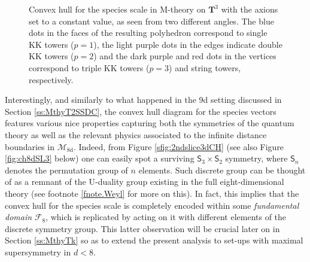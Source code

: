 \begin{figure}[htb]
		\begin{center}
			\caption{\small Convex hull for the species scale in M-theory on $\mathbf{T}^3$ with the axions set to a constant value, as seen from two different angles. The blue dots in the faces of the resulting polyhedron correspond to single KK towers ($p=1$), the light purple dots in the edges indicate double KK towers ($p=2$) and the dark purple and red dots in the vertices correspond to triple KK towers ($p=3$) and string towers, respectively.}
			\label{fig:ch8dgeneric}
		\end{center}
\end{figure} 

Interestingly, and similarly to what happened in the 9d setting discussed in Section \ref{ss:MthyT2SSDC}, the convex hull diagram for the species vectors features various nice properties capturing both the symmetries of the quantum theory as well as the relevant physics associated to the infinite distance boundaries in $\mathcal{M}_{\text{8d}}$. Indeed, from Figure \ref{sfig:2ndslice3dCH} (see also Figure \ref{fig:ch8dSL3} below) one can easily spot a surviving $\mathsf{S}_3 \times \mathsf{S}_2$ symmetry, where $\mathsf{S}_n$ denotes the permutation group of $n$ elements. Such discrete group can be thought of as a remnant of the U-duality group existing in the full eight-dimensional theory (see footnote \ref{fnote.Weyl} for more on this). In fact, this implies that the convex hull for the species scale is completely encoded within some \emph{fundamental domain} $\mathscr{F}_{8}$, which is replicated by acting on it with different elements of the discrete symmetry group. This latter observation will be crucial later on in Section \ref{ss:MthyTk} so as to extend the present analysis to set-ups with maximal supersymmetry in $d<8$.

